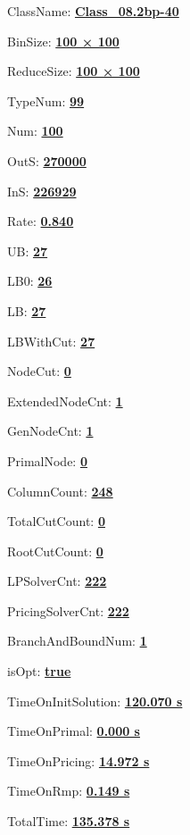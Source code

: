 \documentclass[11pt]{article}
\begin{document}
\pagestyle{empty}


ClassName: \underline{\textbf{Class_08.2bp-40}}
\par
BinSize: \underline{\textbf{100 × 100}}
\par
ReduceSize: \underline{\textbf{100 × 100}}
\par
TypeNum: \underline{\textbf{99}}
\par
Num: \underline{\textbf{100}}
\par
OutS: \underline{\textbf{270000}}
\par
InS: \underline{\textbf{226929}}
\par
Rate: \underline{\textbf{0.840}}
\par
UB: \underline{\textbf{27}}
\par
LB0: \underline{\textbf{26}}
\par
LB: \underline{\textbf{27}}
\par
LBWithCut: \underline{\textbf{27}}
\par
NodeCut: \underline{\textbf{0}}
\par
ExtendedNodeCnt: \underline{\textbf{1}}
\par
GenNodeCnt: \underline{\textbf{1}}
\par
PrimalNode: \underline{\textbf{0}}
\par
ColumnCount: \underline{\textbf{248}}
\par
TotalCutCount: \underline{\textbf{0}}
\par
RootCutCount: \underline{\textbf{0}}
\par
LPSolverCnt: \underline{\textbf{222}}
\par
PricingSolverCnt: \underline{\textbf{222}}
\par
BranchAndBoundNum: \underline{\textbf{1}}
\par
isOpt: \underline{\textbf{true}}
\par
TimeOnInitSolution: \underline{\textbf{120.070 s}}
\par
TimeOnPrimal: \underline{\textbf{0.000 s}}
\par
TimeOnPricing: \underline{\textbf{14.972 s}}
\par
TimeOnRmp: \underline{\textbf{0.149 s}}
\par
TotalTime: \underline{\textbf{135.378 s}}
\par
\newpage


\end{document}
